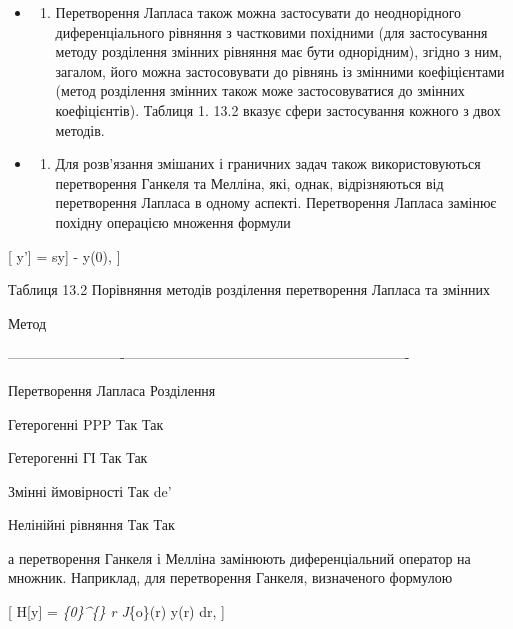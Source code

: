 \documentclass[
  ukrainian,
]{article}
\providecommand{\tightlist}{%
  \setlength{\itemsep}{0pt}\setlength{\parskip}{0pt}}
\begin{document}
\begin{itemize}
\tightlist
\item
  \begin{enumerate}
  \def\labelenumi{\arabic{enumi}.}
  \tightlist
  \item
    Перетворення Лапласа також можна застосувати до неоднорідного
    диференціального рівняння з частковими похідними (для застосування
    методу розділення змінних рівняння має бути однорідним), згідно з
    ним, загалом, його можна застосовувати до рівнянь із змінними
    коефіцієнтами (метод розділення змінних також може застосовуватися
    до змінних коефіцієнтів). Таблиця 1. 13.2 вказує сфери застосування
    кожного з двох методів.
  \end{enumerate}
\item
  \begin{enumerate}
  \def\labelenumi{\arabic{enumi}.}
  \setcounter{enumi}{1}
  \tightlist
  \item
    Для розв'язання змішаних і граничних задач також використовуються
    перетворення Ганкеля та Мелліна, які, однак, відрізняються від
    перетворення Лапласа в одному аспекті. Перетворення Лапласа замінює
    похідну операцією множення формули
  \end{enumerate}
\end{itemize}

{[} \mathscr{L}{[}y'{]} = s\mathscr{L}{[}y{]} - y(0), {]}

Таблиця 13.2 Порівняння методів розділення перетворення Лапласа та
змінних

\textbar{} Метод \textbar{} \textbar{}

\textbar-------------------------\textbar---------------------------\textbar----------------------------------\textbar{}

\textbar{} Перетворення Лапласа \textbar{} Розділення \textbar{}

Гетерогенні PPP \textbar{} Так \textbar{} Так \textbar{}

Гетерогенні ГІ \textbar{} Так \textbar{} Так \textbar{}

Змінні ймовірності \textbar{} Так \textbar{} de' \textbar{}

Нелінійні рівняння \textbar{} Так \textbar{} Так \textbar{}

а перетворення Ганкеля і Мелліна замінюють диференціальний оператор на
множник. Наприклад, для перетворення Ганкеля, визначеного формулою

{[} H{[}y{]} = \int\emph{\{0\}\^{}\{\infty\} r J}\{o\}(\xi r) y(r) dr,
{]}
\end{document}
